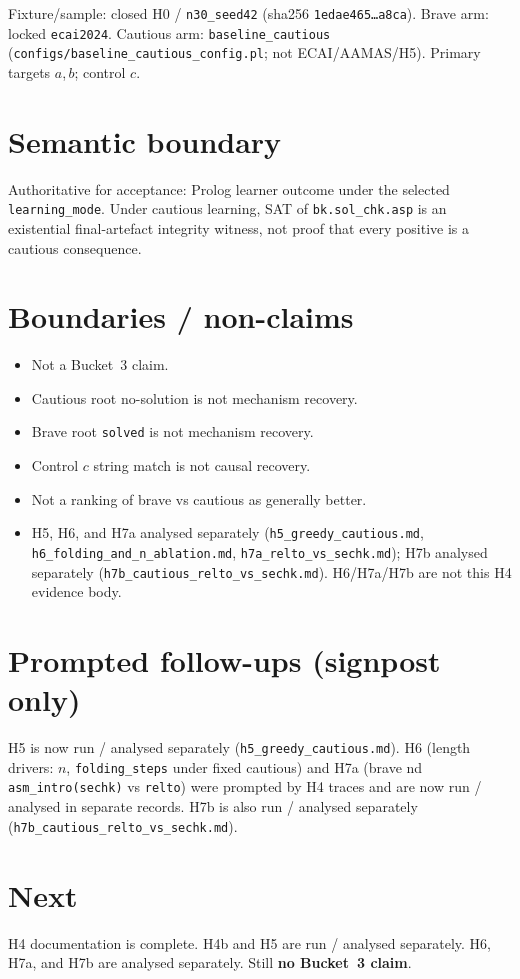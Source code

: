 \documentclass[11pt]{article}
\begin{document}
Fixture/sample: closed H0  /
\texttt{n30\_seed42}
(sha256 \texttt{1edae465\ldots a8ca}).
Brave arm: locked \texttt{ecai2024}.
Cautious arm: \texttt{baseline\_cautious}
(\texttt{configs/baseline\_cautious\_config.pl}; not ECAI/AAMAS/H5).
Primary targets \(a\),\,\(b\); control \(c\).

\section{Semantic boundary}

Authoritative for acceptance: Prolog learner outcome under the selected
\texttt{learning\_mode}.
Under cautious learning, SAT of \texttt{bk.sol\_chk.asp} is an existential
final-artefact integrity witness, not proof that every positive is a cautious
consequence.

\section{Boundaries / non-claims}

\begin{itemize}
  \item Not a Bucket~3 claim.
  \item Cautious root no-solution is not mechanism recovery.
  \item Brave root \texttt{solved} is not mechanism recovery.
  \item Control \(c\) string match is not causal recovery.
  \item Not a ranking of brave vs cautious as generally better.
  \item H5, H6, and H7a analysed separately
    (\texttt{h5\_greedy\_cautious.md},
    \texttt{h6\_folding\_and\_n\_ablation.md},
    \texttt{h7a\_relto\_vs\_sechk.md}); H7b analysed separately
    (\texttt{h7b\_cautious\_relto\_vs\_sechk.md}).
    H6/H7a/H7b are not this H4 evidence body.
\end{itemize}

\section{Prompted follow-ups (signpost only)}

H5 is now run / analysed separately (\texttt{h5\_greedy\_cautious.md}).
H6 (length drivers: \(n\), \texttt{folding\_steps} under fixed cautious) and
H7a (brave nd \texttt{asm\_intro(sechk)} vs \texttt{relto}) were prompted by
H4 traces and are now run / analysed in separate records. H7b is also run /
analysed separately (\texttt{h7b\_cautious\_relto\_vs\_sechk.md}).

\section{Next}

H4 documentation is complete.
H4b and H5 are run / analysed separately.
H6, H7a, and H7b are analysed separately.
Still \textbf{no Bucket~3 claim}.
\end{document}
